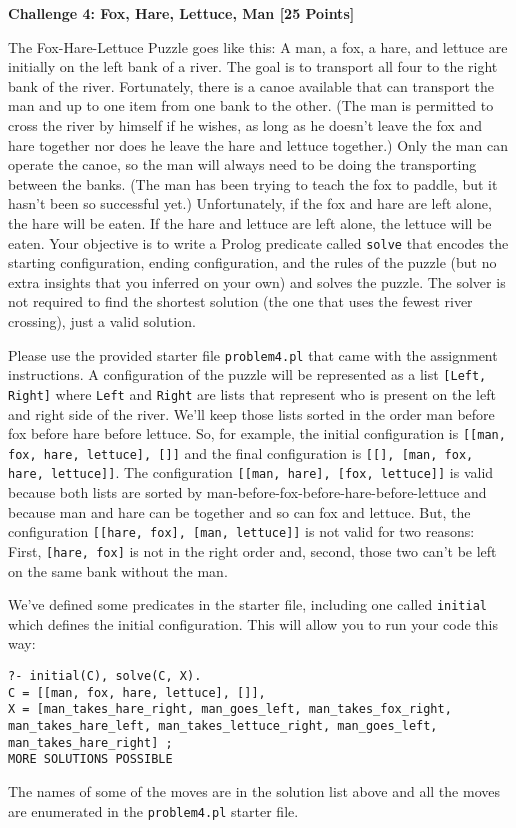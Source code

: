 \documentclass[12pt]{article}
\newcommand{\Problem}[3]{\mbox{} \newline \noindent \textbf{\textbf{Challenge #1: #2 [#3 Points] \\ }}}
\begin{document}
\Problem{4}{Fox, Hare, Lettuce, Man}{25}

The Fox-Hare-Lettuce Puzzle goes like this:  A man, a fox, a hare, and lettuce are initially on the left bank of a river.  The goal is to transport all four to the right bank of the river.  Fortunately, there is a canoe available that can transport the man and up to one item from one bank to the other.  (The man is permitted to cross the river by himself if he wishes, as long as he doesn't leave the fox and hare together nor does he leave the hare and lettuce together.)  Only the man can operate the canoe, so the man will always need to be doing the transporting between the banks.  (The man has been trying to teach the fox to paddle, but it hasn't been so successful yet.)  Unfortunately, if the fox and hare are left alone, the hare will be eaten.  If the hare and lettuce are left alone, the lettuce will be eaten.  Your objective is to write a Prolog predicate called \verb+solve+ that encodes the starting configuration, ending configuration, and the rules of the puzzle (but no extra insights that you inferred on your own) and solves the puzzle.  The solver is not required to find the shortest solution (the one that uses the fewest river crossing), just a valid solution.  

Please use the provided starter file \verb+problem4.pl+ that came with the assignment instructions.  A configuration of the puzzle will be represented as a list \verb+[Left, Right]+ where \verb+Left+ and \verb+Right+ are lists that represent who is present on the left and right side of the river.  We'll keep those lists sorted in the order man before fox before hare before lettuce.  So, for example, the initial configuration is \verb+[[man, fox, hare, lettuce], []]+ and the final configuration is \verb+[[], [man, fox, hare, lettuce]]+.  The configuration \verb+[[man, hare], [fox, lettuce]]+ is valid because both lists are sorted by man-before-fox-before-hare-before-lettuce and because man and hare can be together and so can fox and lettuce.  But, the configuration \verb+[[hare, fox], [man, lettuce]]+ is not valid for two reasons:  First, \verb+[hare, fox]+ is not in the right order and, second, those two can't be left on the same bank without the man.

We've defined some predicates in the starter file, including one called \verb+initial+ which defines the initial configuration.  This will allow you to run your code this way:
\begin{verbatim}
?- initial(C), solve(C, X).
C = [[man, fox, hare, lettuce], []],
X = [man_takes_hare_right, man_goes_left, man_takes_fox_right, 
man_takes_hare_left, man_takes_lettuce_right, man_goes_left, 
man_takes_hare_right] ;
MORE SOLUTIONS POSSIBLE
\end{verbatim}
The names of some of the moves are  in the solution list above and all the moves are enumerated in the \verb+problem4.pl+ starter file.
\end{document}

